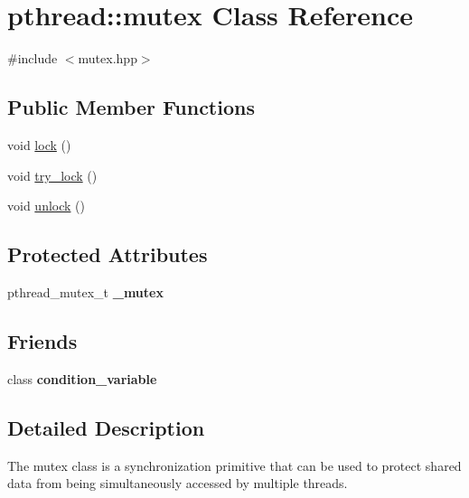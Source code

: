 \hypertarget{classpthread_1_1mutex}{}\section{pthread\+:\+:mutex Class Reference}
\label{classpthread_1_1mutex}


{\ttfamily \#include $<$mutex.\+hpp$>$}

\subsection*{Public Member Functions}
\begin{DoxyCompactItemize}
\item 
void \hyperlink{classpthread_1_1mutex_a49f2565e6ba9f206d7f367897fca9435}{lock} ()
\item 
void \hyperlink{classpthread_1_1mutex_af718b37e950e7928617b264915af0a73}{try\+\_\+lock} ()
\item 
void \hyperlink{classpthread_1_1mutex_adfac0bda708dd01320763c57d5a7a203}{unlock} ()
\end{DoxyCompactItemize}
\subsection*{Protected Attributes}
\begin{DoxyCompactItemize}
\item 
pthread\+\_\+mutex\+\_\+t {\bfseries \+\_\+mutex}\hypertarget{classpthread_1_1mutex_aac562c2ef4664af42fcc24298b00df47}{}\label{classpthread_1_1mutex_aac562c2ef4664af42fcc24298b00df47}

\end{DoxyCompactItemize}
\subsection*{Friends}
\begin{DoxyCompactItemize}
\item 
class {\bfseries condition\+\_\+variable}\hypertarget{classpthread_1_1mutex_a89c9b6aa2256fa5efd92a333d96381d4}{}\label{classpthread_1_1mutex_a89c9b6aa2256fa5efd92a333d96381d4}

\end{DoxyCompactItemize}


\subsection{Detailed Description}
The mutex class is a synchronization primitive that can be used to protect shared data from being simultaneously accessed by multiple threads.

